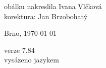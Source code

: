 \vspace*{\fill}
\hspace{10mm}obálku nakreslila Ivana Vlčková\\
korektura: Jan Brzobohatý\\
\begin{otherlanguage}{czech}
Brno, \today\\
\end{otherlanguage}
verze 7.84\\
vysázeno jazykem \LaTeXe
\vspace{2cm}
\newpage
